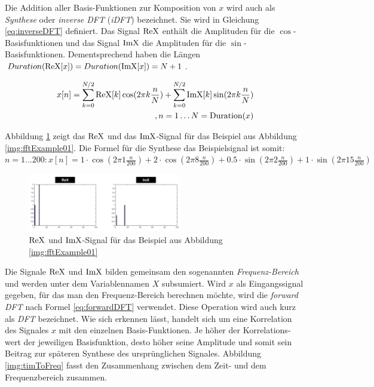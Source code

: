 Die Addition aller Basis-Funktionen zur Komposition von $x$ wird auch als \emph{Synthese} oder \emph{inverse DFT} (\emph{iDFT}) bezeichnet. Sie wird in Gleichung  \ref{eq:inverseDFT} definiert. Das Signal $\operatorname{ReX}$ enthält die Amplituden für die $\cos$-Basisfunktionen und das Signal $\operatorname{ImX}$ die Amplituden für die $\sin$-Basisfunktionen. Dementsprechend haben die Längen $Duration(\operatorname{ReX}[x]) = Duration(\operatorname{ImX}[x]) = N+1$.

\begin{equation}
\begin{split}
x[n] = \sum_{k = 0}^{N/2}\operatorname{ReX}[k]\cos(2\pi k \frac{n}{N}) + \sum_{k = 0}^{N/2}\operatorname{ImX}[k]\sin(2\pi k \frac{n}{N}) \\
,n = 1 \ldots N = \text{Duration}(x)
\end{split}
\label{eq:inverseDFT}
\end{equation}

Abbildung \ref{img:reXimX} zeigt das $\operatorname{ReX}$ und das $\operatorname{ImX}$-Signal für das Beispiel aus Abbildung \ref{img:fftExample01}. Die Formel für die Synthese das Beispielsignal ist somit: $n = 1 \ldots 200: x[n] = 1 \cdot \cos(2\pi 1 \frac{n}{200}) + 2 \cdot \cos(2\pi 8 \frac{n}{200}) + 0.5 \cdot \sin(2\pi 2 \frac{n}{200}) + 1 \cdot \sin(2\pi 15 \frac{n}{200})  $

\begin{figure}[h]
	\centering
	\includegraphics[width=0.6\textwidth]{bilder/reXimX.png}
	\caption{ $\operatorname{ReX}$ und $\operatorname{ImX}$-Signal für das Beispiel aus Abbildung \ref{img:fftExample01}}
	\label{img:reXimX}
\end{figure}

Die Signale $\operatorname{ReX}$ und $\operatorname{ImX}$ bilden gemeinsam den sogenannten \emph{Frequenz-Bereich} und werden unter dem Variablennamen $X$ subsumiert. Wird $x$ als Eingangssignal gegeben, für das man den Frequenz-Bereich berechnen möchte, wird die \emph{forward DFT} nach Formel \ref{eq:forwardDFT} verwendet. Diese Operation wird auch kurz als \emph{DFT} bezeichnet. Wie sich erkennen lässt, handelt sich um eine Korrelation des Signales $x$ mit den einzelnen Basis-Funktionen. Je höher der Korrelations-wert der jeweiligen Basisfunktion, desto höher seine Amplitude und somit sein Beitrag zur späteren Synthese des ursprünglichen Signales. Abbildung \ref{img:timToFreq} fasst den Zusammenhang zwischen dem Zeit- und dem Frequenzbereich zusammen.

